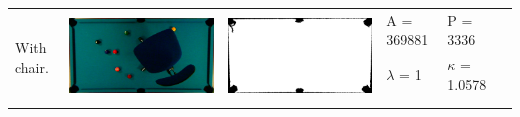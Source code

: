 \begin{tabular}{|l|c|c|l|l|c|}
\multirow{4}{*}{With chair.} & \multirow{4}{*}{\includegraphics[scale=0.08]{../images/1/5_img.png}} & \multirow{4}{*}{\includegraphics[scale=0.08]{../images/1/5_mask.png}} & A = 369881 & P = 3336 & \multirow{4}{*}{}\\  
& & & $\lambda$ = 1 & $\kappa$ = 1.0578 & \\
&&&&&\\
&&&&&\\
\hline


\end{tabular}
